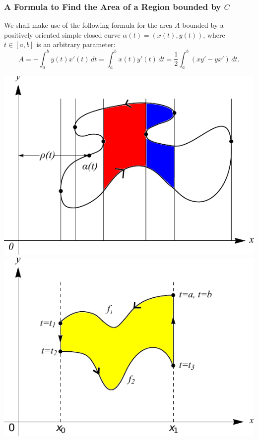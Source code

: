 \documentclass{beamer}
\theoremstyle{definition}
\theoremstyle{remark}
\renewcommand{\=}{&=&}
\newcommand{\<}{\langle}
\renewcommand{\>}{\rangle}
\begin{document}
\begin{frame}[t]
\frametitle{A Formula to Find the Area of a Region bounded by $C$}
\begin{block}{}
We shall make use of the following formula for the area $A$ bounded by a positively oriented
simple closed curve $\alpha(t) = (x(t),y(t))$, where $t \in [a,b]$ is an arbitrary parameter:
\[ A = - \int_a^b y(t) x'(t) \, dt = \int_a^b x(t) y'(t) \, dt = \frac{1}{2} \int_a^b (xy'-yx') \, dt. \]
\end{block}
\vspace{-1cm}
\begin{center}
\includegraphics[scale=0.6]{BoundedArea1.pdf} 
\includegraphics[scale=0.6]{BoundedArea2.pdf}
\end{center}
\end{frame}
\end{document}
